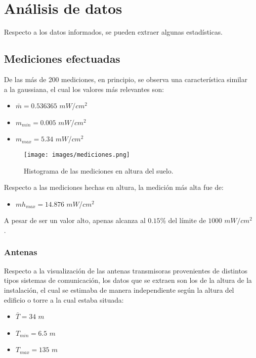 \section{Análisis de datos}
Respecto a los datos informados, se pueden extraer algunas estadísticas.

\subsection{Mediciones efectuadas}
De las más de 200 mediciones, en principio, se observa una característica similar a la gaussiana, el cual los valores más relevantes son:

\begin{itemize}
    \item $\bar{m} = 0.536365$ $mW$/$cm^2$
    \item $m_{min} = 0.005$ $mW$/$cm^2$
    \item $m_{max} = 5.34 $ $mW$/$cm^2$
\end{itemize}

\begin{figure}[H]
\centering
\texttt{[image: images/mediciones.png]}
\caption{Histograma de las mediciones en altura del suelo.}
\label{5.0}
\end{figure}

Respecto a las mediciones hechas en altura, la medición más alta fue de:

\begin{itemize}
    \item $mh_{max} = 14.876 $ $mW$/$cm^2$
\end{itemize}

A pesar de ser un valor alto, apenas alcanza al $0.15$\% del límite de $1000$ $mW/cm^2$.

\subsubsection*{Antenas}
Respecto a la visualización de las antenas transmisoras provenientes de distintos tipos sistemas de comunicación, los datos que se extraen son los de la altura de la instalación, el cual se estimaba  de manera independiente según la altura del edificio o torre a la cual estaba situada:

\begin{itemize}
    \item $\bar{T} = 34$ $m$
    \item $T_{min} = 6.5$ $m$
    \item $T_{max} = 135 $ $m$
\end{itemize}

